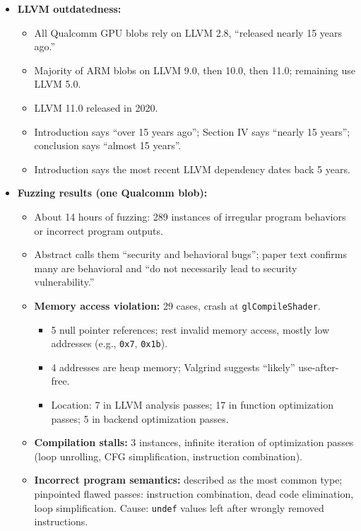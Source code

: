 \documentclass[11pt,a4paper]{article}
\begin{document}
\begin{enumerate}
\begin{itemize}[leftmargin=*, itemsep=1pt, topsep=2pt]
        \item \textbf{LLVM outdatedness:}
        \begin{itemize}[itemsep=0pt]
            \item All Qualcomm GPU blobs rely on LLVM 2.8, ``released nearly 15 years ago.''
            \item Majority of ARM blobs on LLVM 9.0, then 10.0, then 11.0; remaining use LLVM 5.0.
            \item LLVM 11.0 released in 2020.
            \item Introduction says ``over 15 years ago''; Section IV says ``nearly 15 years''; conclusion says ``almost 15 years''.
            \item Introduction says the most recent LLVM dependency dates back 5 years.
        \end{itemize}
        \item \textbf{Fuzzing results (one Qualcomm blob):}
        \begin{itemize}[itemsep=0pt]
            \item About 14 hours of fuzzing: 289 instances of irregular program behaviors or incorrect program outputs.
            \item Abstract calls them ``security and behavioral bugs''; paper text confirms many are behavioral and ``do not necessarily lead to security vulnerability.''
            \item \textbf{Memory access violation:} 29 cases, crash at \texttt{glCompileShader}.
            \begin{itemize}[itemsep=0pt]
                \item 5 null pointer references; rest invalid memory access, mostly low addresses (e.g., \texttt{0x7}, \texttt{0x1b}).
                \item 4 addresses are heap memory; Valgrind suggests ``likely'' use-after-free.
                \item Location: 7 in LLVM analysis passes; 17 in function optimization passes; 5 in backend optimization passes.
            \end{itemize}
            \item \textbf{Compilation stalls:} 3 instances, infinite iteration of optimization passes (loop unrolling, CFG simplification, instruction combination).
            \item \textbf{Incorrect program semantics:} described as the most common type; pinpointed flawed passes: instruction combination, dead code elimination, loop simplification. Cause: \texttt{undef} values left after wrongly removed instructions.

\end{itemize}
\end{itemize}
\end{enumerate}
\end{document}
